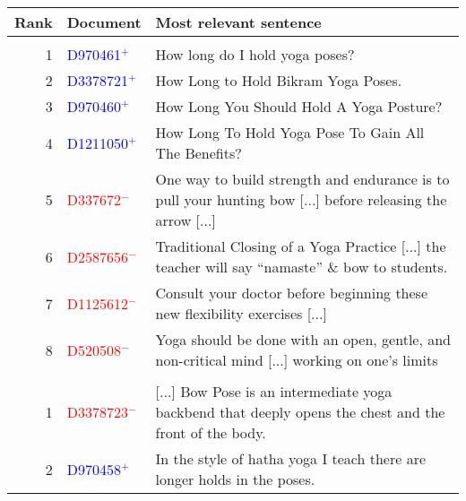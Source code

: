 \documentclass{standalone}
\begin{document}
\begin{tabularx}{27cm}{rll}
    \toprule
    \textbf{Rank} & \textbf{Document}                & \textbf{Most relevant sentence}                                                                              \\
    \midrule
    \multicolumn{3}{l}{\textbf{\sratt{}}}                                                                                                                           \\
    \num{1}       & \textcolor{blue}{D970461$^{+}$}  & How long do I hold yoga poses?                                                                               \\
    \num{2}       & \textcolor{blue}{D3378721$^{+}$} & How Long to Hold Bikram Yoga Poses.                                                                          \\
    \num{3}       & \textcolor{blue}{D970460$^{+}$}  & How Long You Should Hold A Yoga Posture?                                                                     \\
    \num{4}       & \textcolor{blue}{D1211050$^{+}$} & How Long To Hold Yoga Pose To Gain All The Benefits?                                                         \\
    \num{5}       & \textcolor{red}{D337672$^{-}$}   & One way to build strength and endurance is to pull your hunting bow [...] before releasing the arrow [...]   \\
    \num{6}       & \textcolor{red}{D2587656$^{-}$}  & Traditional Closing of a Yoga Practice [...] the teacher will say ``namaste'' \& bow to students.            \\
    \num{7}       & \textcolor{red}{D1125612$^{-}$}  & Consult your doctor before beginning these new flexibility exercises [...]                                   \\
    \num{8}       & \textcolor{red}{D520508$^{-}$}   & Yoga should be done with an open, gentle, and non-critical mind [...] working on one's limits                \\
    \midrule
    \multicolumn{3}{l}{\textbf{\plsem{}}}                                                                                                                           \\
    \num{1}       & \textcolor{red}{D3378723$^{-}$}  & [...] Bow Pose is an intermediate yoga backbend that deeply opens the chest and the front of the body.       \\
    \num{2}       & \textcolor{blue}{D970458$^{+}$}  & In the style of hatha yoga I teach there are longer holds in the poses.                                      \\

\end{tabularx}
\end{document}
